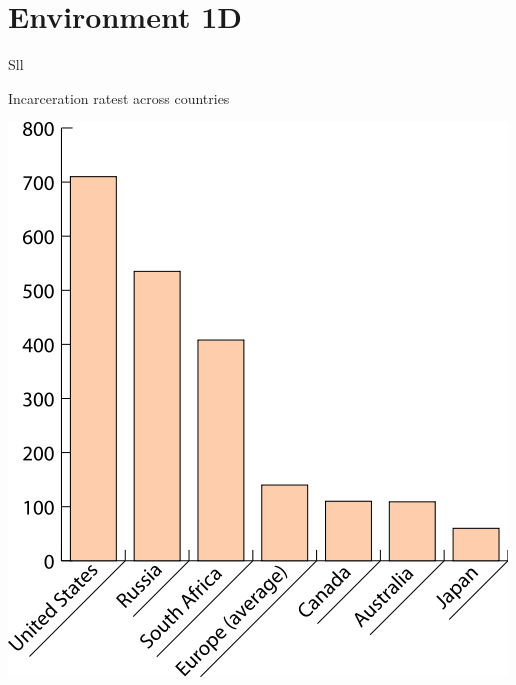 
\section{Environment 1D}


\begin{chart}{S}{ll}
\caption{Incarceration ratest across countries}
\label{chart:incarceration}
\includegraphics[width=\chartwidth,height=\chartheight]{incarceration}  
\end{chart}

